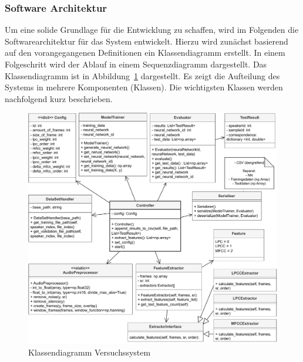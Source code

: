 \subsubsection{Software Architektur}
Um eine solide Grundlage für die Entwicklung zu schaffen, wird im Folgenden die Softwarearchitektur für das System entwickelt.
Hierzu wird zunächst basierend auf den vorangegangenen Definitionen ein Klassendiagramm erstellt.
In einem Folgeschritt wird der Ablauf in einem Sequenzdiagramm dargestellt. %
\newparagraph
Das Klassendiagramm ist in Abbildung~\ref{fig:klassendiagram-versuchssystem} dargestellt.
Es zeigt die Aufteilung des Systems in mehrere Komponenten (Klassen).
Die wichtigsten Klassen werden nachfolgend kurz beschrieben.
\begin{figure}[H]
    \centering
    \includegraphics[width=\textwidth, keepaspectratio]{images/klassendiagram-versuchssystem.pdf}
    \caption{Klassendiagramm Versuchssystem}
    \label{fig:klassendiagram-versuchssystem}
\end{figure}\noindent


